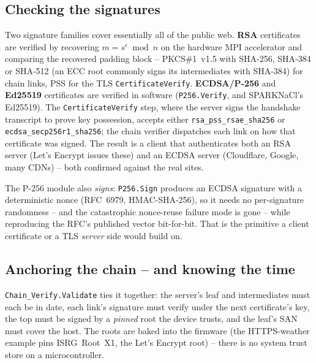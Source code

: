 \subsection{Checking the signatures}

Two signature families cover essentially all of the public web. \textbf{RSA}
certificates are verified by recovering $m = s^e \bmod n$ on the hardware MPI
accelerator and comparing the recovered padding block -- PKCS\#1~v1.5 with
SHA-256, SHA-384 or SHA-512 (an ECC root commonly signs its intermediates with
SHA-384) for chain links, PSS for the TLS \texttt{CertificateVerify}.
\textbf{ECDSA/P-256} and \textbf{Ed25519} certificates are verified in software
(\texttt{P256.Verify}, and SPARKNaCl's Ed25519). The \texttt{CertificateVerify}
step, where the server signs the handshake transcript to prove key possession,
accepts either \texttt{rsa\_pss\_rsae\_sha256} or \texttt{ecdsa\_secp256r1\_sha256};
the chain verifier dispatches each link on how that certificate was signed. The
result is a client that authenticates both an RSA server (Let's Encrypt issues
these) and an ECDSA server (Cloudflare, Google, many CDNs) -- both confirmed
against the real sites.

The P-256 module also \emph{signs}: \texttt{P256.Sign} produces an ECDSA signature
with a deterministic nonce (RFC~6979, HMAC-SHA-256), so it needs no per-signature
randomness -- and the catastrophic nonce-reuse failure mode is gone -- while
reproducing the RFC's published vector bit-for-bit. That is the primitive a client
certificate or a TLS \emph{server} side would build on.

\subsection{Anchoring the chain -- and knowing the time}

\texttt{Chain\_Verify.Validate} ties it together: the server's leaf and
intermediates must each be in date, each link's signature must verify under the
next certificate's key, the top must be signed by a \emph{pinned} root the device
trusts, and the leaf's SAN must cover the host. The roots are baked into the
firmware (the HTTPS-weather example pins ISRG~Root~X1, the Let's Encrypt root) --
there is no system trust store on a microcontroller.

